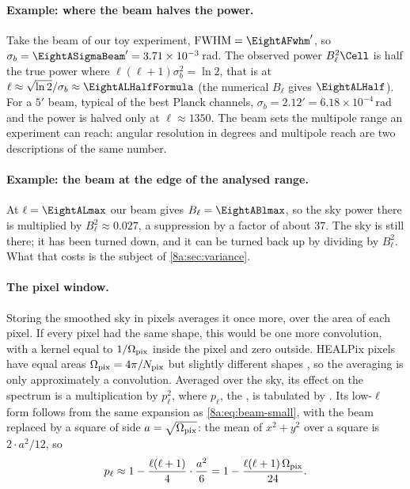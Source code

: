 \paragraph{Example: where the beam halves the power.}
Take the beam of our toy experiment, ${\rm FWHM}=\EightAFwhm'$, so
$\sigma_b=\EightASigmaBeam'=3.71\times10^{-3}$\,rad. The observed power $B_\ell^2\Cell$ is half
the true power where $\ell(\ell+1)\sigma_b^2=\ln2$, that is at
$\ell\approx\sqrt{\ln2}/\sigma_b\approx\EightALHalfFormula$ (the numerical $B_\ell$ gives
$\EightALHalf$). For a $5'$ beam, typical of the best Planck channels, $\sigma_b=2.12'
=6.18\times10^{-4}$\,rad and the power is halved only at $\ell\approx1350$. The beam sets
the multipole range an experiment can reach: angular resolution in degrees and multipole
reach are two descriptions of the same number.

\paragraph{Example: the beam at the edge of the analysed range.}
At $\ell=\EightALmax$ our beam gives $B_\ell=\EightABlmax$, so the sky power there is
multiplied by $B_\ell^2\approx0.027$, a suppression by a factor of about $37$. The sky is
still there; it has been turned down, and it can be turned back up by dividing by $B_\ell^2$.
What that costs is the subject of \cref{8a:sec:variance}.

\paragraph{The pixel window.}
Storing the smoothed sky in pixels averages it once more, over the area of each pixel. If
every pixel had the same shape, this would be one more convolution, with a kernel equal to
$1/\Omega_{\rm pix}$ inside the pixel and zero outside. HEALPix pixels have equal areas
$\Omega_{\rm pix}=4\pi/N_{\rm pix}$ but slightly different shapes \cite{Gorski2005}, so the
averaging is only approximately a convolution. Averaged over the sky, its effect on the
spectrum is a multiplication by $p_\ell^2$, where $p_\ell$, the , is tabulated by  . Its low-$\ell$ form
follows from the same expansion as \eqref{8a:eq:beam-small}, with the beam replaced by a square
of side $a=\sqrt{\Omega_{\rm pix}}$: the mean of $x^2+y^2$ over a square is
$2\cdot a^2/12$, so
\begin{equation}
  p_\ell\approx1-\frac{\ell(\ell+1)}{4}\cdot\frac{a^2}{6}=1-\frac{\ell(\ell+1)\,\Omega_{\rm pix}}{24}.
  \label{8a:eq:pixwin}
\end{equation}

